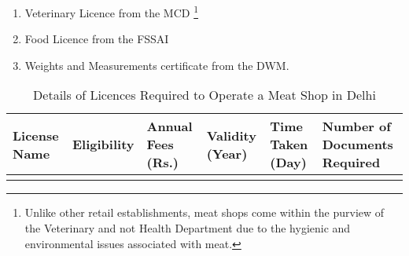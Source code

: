 \documentclass[a4paper, 12pt]{article}
\begin{document}
\begin{enumerate}
\item Veterinary Licence from the MCD \footnote{ Unlike other retail establishments, meat shops come within the purview of the Veterinary and not Health Department due to the hygienic and environmental issues associated with meat.}
\item Food Licence from the FSSAI
\item Weights and Measurements certificate from the DWM.
\end{enumerate}

\begin{longtable}{>{\raggedright}p{2.5cm}>{\raggedright}p{3cm}>{\raggedright}p{3cm}>{\raggedright}p{2cm}>{\raggedright}p{2cm}>{\raggedright\arraybackslash}p{2.5cm}}
\caption{Details of Licences Required to Operate a Meat Shop in Delhi} \\
License Name & Eligibility & Annual Fees (Rs.) & Validity (Year) & Time Taken (Day) & Number of Documents Required \\
\midrule
\endfirsthead
\endhead
\midrule
\endlastfoot


\end{longtable}
\end{document}
